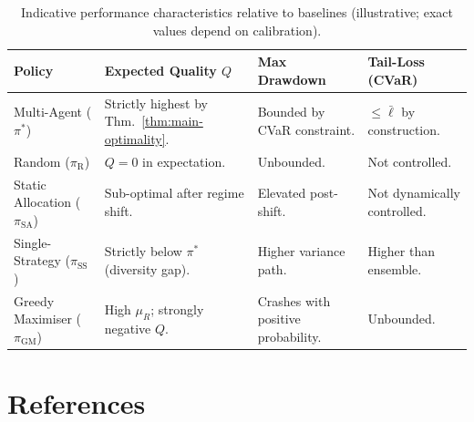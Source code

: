 \documentclass[12pt,openany]{book}
\numberwithin{equation}{chapter}
\theoremstyle{plain}
\theoremstyle{definition}
\theoremstyle{remark}
\numberwithin{equation}{chapter}
\theoremstyle{plain}
\begin{document}
\begin{table}[H]
\centering
\caption{Indicative performance characteristics relative to baselines
         (illustrative; exact values depend on calibration).}
\label{tab:performance-benchmarks}
\small
\begin{tabularx}{\linewidth}{@{} l X X X @{}}
\toprule
\textbf{Policy} & \textbf{Expected Quality $Q$} & \textbf{Max Drawdown} & \textbf{Tail-Loss (CVaR)} \\
\midrule
Multi-Agent ($\pi^*$)
  & Strictly highest by Thm.~\ref{thm:main-optimality}.
  & Bounded by CVaR constraint.
  & $\le\bar{\ell}$ by construction. \\[3pt]
Random ($\pi_{\mathrm{R}}$)
  & $Q = 0$ in expectation.
  & Unbounded.
  & Not controlled. \\[3pt]
Static Allocation ($\pi_{\mathrm{SA}}$)
  & Sub-optimal after regime shift.
  & Elevated post-shift.
  & Not dynamically controlled. \\[3pt]
Single-Strategy ($\pi_{\mathrm{SS}}$)
  & Strictly below $\pi^*$ (diversity gap).
  & Higher variance path.
  & Higher than ensemble. \\[3pt]
Greedy Maximiser ($\pi_{\mathrm{GM}}$)
  & High $\mu_R$; strongly negative $Q$.
  & Crashes with positive probability.
  & Unbounded. \\
\bottomrule
\end{tabularx}
\end{table}

\chapter*{References}
\end{document}
